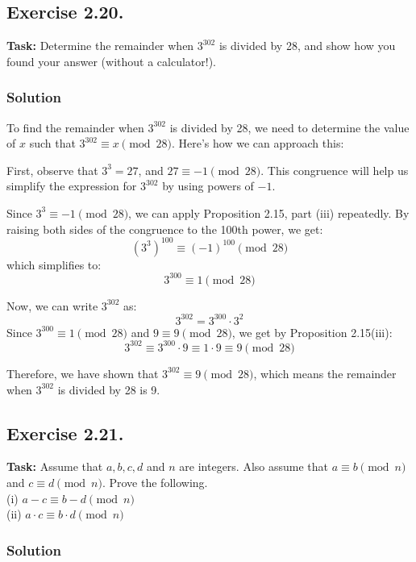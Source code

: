 \documentclass{article}
\begin{document}
\newpage

\subsection{Exercise 2.20.}
\textbf{Task:} Determine the remainder when $3^{302}$ is divided by 28, and show how you found your answer (without a calculator!).

\subsubsection*{Solution}

To find the remainder when $3^{302}$ is divided by 28, we need to determine the value of $x$ such that $3^{302} \equiv x \pmod{28}$. Here’s how we can approach this:

\noindent First, observe that $3^3 = 27$, and $27 \equiv -1 \pmod{28}$. This congruence will help us simplify the expression for $3^{302}$ by using powers of $-1$.

\noindent Since $3^3 \equiv -1 \pmod{28}$, we can apply Proposition 2.15, part (iii) repeatedly. By raising both sides of the congruence to the 100th power, we get:
\[
(3^3)^{100} \equiv (-1)^{100} \pmod{28}
\]
which simplifies to:
\[
3^{300} \equiv 1 \pmod{28}
\]

\noindent Now, we can write $3^{302}$ as:
\[
3^{302} = 3^{300} \cdot 3^2
\]
Since $3^{300} \equiv 1 \pmod{28}$ and $9 \equiv 9 \pmod{28}$, we get by Proposition 2.15(iii):
\[
3^{302} \equiv 3^{300} \cdot 9 \equiv 1 \cdot 9 \equiv 9 \pmod{28}
\]

Therefore, we have shown that $3^{302} \equiv 9 \pmod{28}$, which means the remainder when $3^{302}$ is divided by 28 is 9.

\newpage

\subsection{Exercise 2.21.}
\textbf{Task:} Assume that $a,b,c,d$ and $n$ are integers. Also assume that $a \equiv b \pmod{n}$ and $c \equiv d \pmod{n}$. Prove the following.\\
(i) $a-c \equiv b-d \pmod{n}$\\
(ii) $a\cdot c \equiv b\cdot d \pmod{n}$

\subsubsection*{Solution}
\end{document}
